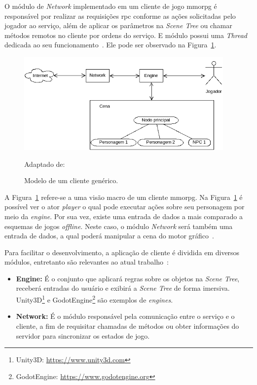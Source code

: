 O módulo de \textit{Network} implementado em um cliente de jogo \ac{mmorpg} é responsável por realizar as requisições \ac{rpc} conforme as ações solicitadas pelo jogador ao serviço, além de aplicar os parâmetros na \textit{Scene Tree} ou chamar métodos remotos no cliente por ordens do serviço.
%
E módulo possui uma \textit{Thread} dedicada ao seu funcionamento~\cite{albion_online_unite}.
%
Ele pode ser observado na Figura~\ref{fig:gateway}.


\begin{figure}[htb!]
\caption{Modelo de um cliente genérico.}
\label{fig:gateway}
\includegraphics[height=5cm]{img/cap2/cliente.png}
\centering

Adaptado de:~\cite{507915, faber}
\end{figure}


A Figura~\ref{fig:gateway} refere-se a uma visão macro de um cliente \ac{mmorpg}.
%
Na Figura~\ref{fig:gateway} é possível ver o ator \textit{player} o qual pode executar ações sobre seu personagem por meio da \textit{engine}.
%
Por sua vez, existe uma entrada de dados a mais comparado a esquemas de jogos \textit{offline}.
%
Neste caso, o módulo \textit{Network} será também uma entrada de dados, a qual poderá manipular a cena do motor gráfico~\cite{faber}.



Para facilitar o desenvolvimento, a aplicação de cliente é dividida em diversos módulos, entretanto são relevantes ao atual trabalho~\cite{albion_online_unite}:



\begin{itemize}
  \item \textbf{Engine:} É o conjunto que aplicará regras sobre os objetos na \textit{Scene Tree}, receberá entradas do usuário e exibirá a \textit{Scene Tree} de forma imersiva. Unity3D\footnote{Unity3D: \url{https://www.unity3d.com}} e GodotEngine\footnote{GodotEngine: \url{https://www.godotengine.org}} são exemplos de \textit{engines}.
  \item \textbf{Network:} É o módulo responsável pela comunicação entre o serviço e o cliente, a fim de requisitar chamadas de métodos ou obter informações do servidor para sincronizar os estados de jogo.
\end{itemize}



